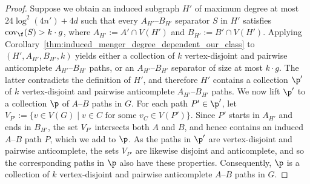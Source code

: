\begin{proof}
    Suppose we obtain an induced subgraph $H'$ of maximum degree at most $24 \log^2 (4n') + 4d$ such that every $A_{H'}$--$B_{H'}$ separator $S$ in $H'$ satisfies $\mathrm{cov}_{\f}(S) > k \cdot g$, where $A_{H'} := A' \cap V(H')$ and $B_{H'} := B' \cap V(H')$. Applying Corollary~\ref{thm:induced_menger_degree_dependent_our_class} to $(H', A_{H'}, B_{H'}, k)$ yields either a collection of $k$ vertex-disjoint and pairwise anticomplete $A_{H'}$--$B_{H'}$ paths, or an $A_{H'}$--$B_{H'}$ separator of size at most $k \cdot g$. The latter contradicts the definition of $H'$, and therefore $H'$ contains a collection $\p'$ of $k$ vertex-disjoint and pairwise anticomplete $A_{H'}$--$B_{H'}$ paths.
    We now lift $\p'$ to a collection $\p$ of $A$--$B$ paths in $G$. For each path $P' \in \p'$, let $V_{P'} := \{v \in V(G) \mid v \in C \text{ for some } v_{C} \in V(P')\}$. Since $P'$ starts in $A_{H'}$ and ends in $B_{H'}$, the set $V_{P'}$ intersects both $A$ and $B$, and hence contains an induced $A$--$B$ path $P$, which we add to $\p$. As the paths in $\p'$ are vertex-disjoint and pairwise anticomplete, the sets $V_{P'}$ are likewise disjoint and anticomplete, and so the corresponding paths in $\p$ also have these properties. Consequently, $\p$ is a collection of $k$ vertex-disjoint and pairwise anticomplete $A$--$B$ paths in $G$.


\end{proof}
